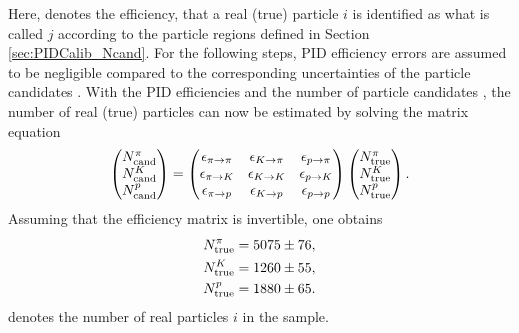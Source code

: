 Here,  denotes the efficiency, that a real (true) particle $i$ is identified as what is called $j$ according to the particle regions defined in Section \ref{sec:PIDCalib_Ncand}. 
For the following steps, PID efficiency errors are assumed to be negligible compared to the corresponding uncertainties of the particle candidates .
With the PID efficiencies  and the number of particle candidates , the number of real (true) particles can now be estimated by solving the matrix equation
\begin{align*}
    \begin{pmatrix} 
        N_{\text{cand}}^{\pi} \\ N_{\text{cand}}^{{K}} \\ N_{\text{cand}}^{{p}}
    \end{pmatrix}
    =
    \begin{pmatrix}
       \epsilon_{{\pi}\rightarrow{\pi}}     & \epsilon_{{{K}}\rightarrow{\pi}}     & \epsilon_{{{p}}\rightarrow{\pi}} \\
       \epsilon_{{\pi}\rightarrow{{\ensuremath{K}}}}   & \epsilon_{{{K}}\rightarrow{{\ensuremath{K}}}}   & \epsilon_{{{p}}\rightarrow{{\ensuremath{K}}}} \\
       \epsilon_{{\pi}\rightarrow{{\ensuremath{p}}}} & \epsilon_{{{K}}\rightarrow{{\ensuremath{p}}}} & \epsilon_{{{p}}\rightarrow{{\ensuremath{p}}}} 
    \end{pmatrix}
    \begin{pmatrix} 
        N_{\text{true}}^{\pi} \\ N_{\text{true}}^{{K}} \\ N_{\text{true}}^{{p} }
    \end{pmatrix}.
\end{align*}
Assuming that the efficiency matrix is invertible, one obtains
\begin{align}
    N_{\text{true}}^{\pi}     &= 5075 \pm 76, \\ 
    N_{\text{true}}^{{K}}   &= 1260 \pm 55, \\ 
    N_{\text{true}}^{{p}} &= 1880 \pm 65.
\end{align}
 denotes the number of real particles $i$ in the sample.

